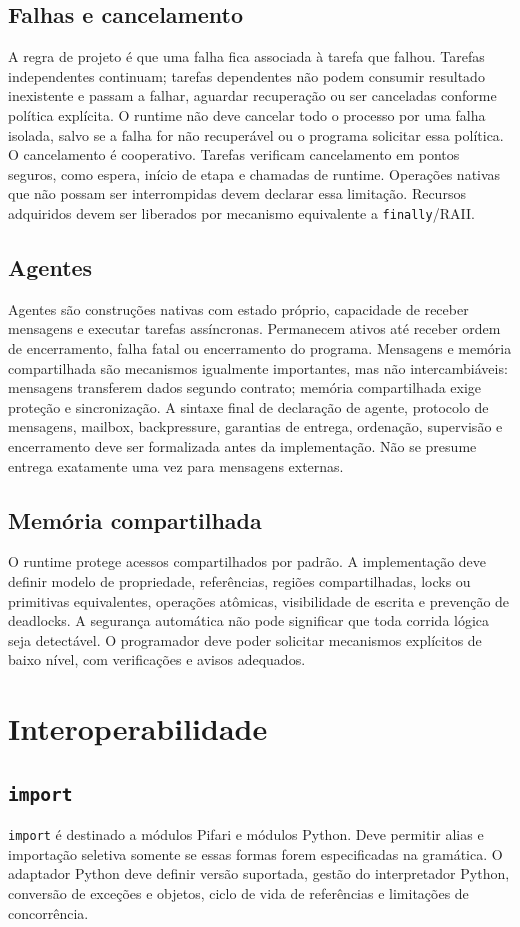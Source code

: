\documentclass[12pt,a4paper]{article}
\begin{document}
\subsection{Falhas e cancelamento}
A regra de projeto é que uma falha fica associada à tarefa que falhou. Tarefas independentes continuam; tarefas dependentes não podem consumir resultado inexistente e passam a falhar, aguardar recuperação ou ser canceladas conforme política explícita. O runtime não deve cancelar todo o processo por uma falha isolada, salvo se a falha for não recuperável ou o programa solicitar essa política.
O cancelamento é cooperativo. Tarefas verificam cancelamento em pontos seguros, como espera, início de etapa e chamadas de runtime. Operações nativas que não possam ser interrompidas devem declarar essa limitação. Recursos adquiridos devem ser liberados por mecanismo equivalente a \texttt{finally}/RAII.
\subsection{Agentes}
Agentes são construções nativas com estado próprio, capacidade de receber mensagens e executar tarefas assíncronas. Permanecem ativos até receber ordem de encerramento, falha fatal ou encerramento do programa. Mensagens e memória compartilhada são mecanismos igualmente importantes, mas não intercambiáveis: mensagens transferem dados segundo contrato; memória compartilhada exige proteção e sincronização.
A sintaxe final de declaração de agente, protocolo de mensagens, mailbox, backpressure, garantias de entrega, ordenação, supervisão e encerramento deve ser formalizada antes da implementação. Não se presume entrega exatamente uma vez para mensagens externas.
\subsection{Memória compartilhada}
O runtime protege acessos compartilhados por padrão. A implementação deve definir modelo de propriedade, referências, regiões compartilhadas, locks ou primitivas equivalentes, operações atômicas, visibilidade de escrita e prevenção de deadlocks. A segurança automática não pode significar que toda corrida lógica seja detectável. O programador deve poder solicitar mecanismos explícitos de baixo nível, com verificações e avisos adequados.
\section{Interoperabilidade}
\subsection{\texttt{import}}
\texttt{import} é destinado a módulos Pifari e módulos Python. Deve permitir alias e importação seletiva somente se essas formas forem especificadas na gramática. O adaptador Python deve definir versão suportada, gestão do interpretador Python, conversão de exceções e objetos, ciclo de vida de referências e limitações de concorrência.
\end{document}
